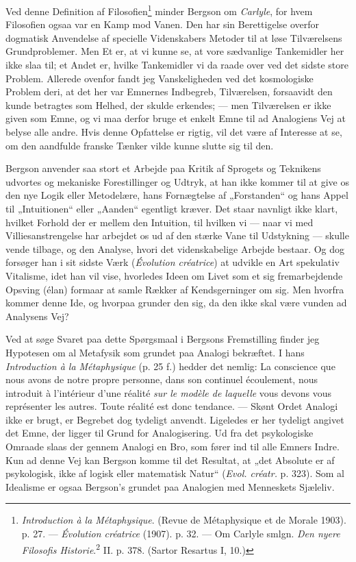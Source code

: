 \documentclass[12pt,a4paper]{book}
\newcommand{\opage}[1]{\marginnote{\footnotesize\textit{[#1]}}}
\begin{document}
Ved denne Definition af Filosofien\footnote{\emph{Introduction à la Métaphysique}.
(Revue de Métaphysique et de Morale 1903). p. 27. --- \emph{Évolution créatrice} (1907).
p. 32. --- Om Carlyle smlgn. \emph{Den nyere Filosofis Historie}.\textsuperscript{2} II.
p. 378. (Sartor Resartus I, 10.)} minder Bergson om \emph{Carlyle}, for hvem Filosofien
ogsaa var en Kamp mod Vanen. Den har sin Berettigelse overfor dogmatisk Anvendelse af
specielle Videnskabers Metoder til at løse Tilværelsens Grundproblemer. Men Et er, at vi
kunne se, at vore sædvanlige Tankemidler her ikke slaa til; et Andet er, hvilke
Tankemidler vi da raade over ved det sidste store Problem. Allerede ovenfor fandt jeg
Vanskeligheden ved det kosmologiske Problem deri, at det her var Emnernes Indbegreb,
Tilværelsen, forsaavidt den kunde betragtes som Helhed, der skulde erkendes; --- men
Tilværelsen er ikke given som Emne, og vi maa derfor bruge et enkelt Emne til ad
Analogiens Vej at belyse alle andre. Hvis denne Opfattelse er rigtig, vil det være af
Interesse at se, om den aandfulde franske Tænker vilde kunne slutte sig til den.

Bergson anvender saa stort et Arbejde paa Kritik af Sprogets og Teknikens udvortes og
mekaniske Forestillinger og Udtryk, at han ikke kommer til at give os den nye Logik eller
Metodelære, hans Fornægtelse af „Forstanden“ og hans Appel til „Intuitionen“ eller
„Aanden“ egentligt kræver. Det staar navnligt ikke klart, hvilket Forhold der er mellem den
Intuition, til hvilken vi --- naar vi med Villiesanstrengelse har arbejdet os ud af den
stærke Vane til Udstykning --- skulle vende tilbage, og den Analyse, hvori det
videnskabelige Arbejde bestaar. Og dog forsøger han i sit sidste Værk (\emph{Évolution
créatrice}) at udvikle en Art spekulativ Vitalisme, idet han vil vise, hvorledes Ideen om
Livet som et sig fremarbejdende Opsving (élan) formaar at samle Rækker af Kendsgerninger
om sig. Men hvorfra kommer denne Ide, og hvorpaa grunder den sig, da den ikke skal være
vunden ad Analysens Vej?

Ved at søge Svaret paa dette Spørgsmaal i Bergsons Fremstilling finder jeg Hypotesen om
al Metafysik som grundet \opage{318} paa Analogi bekræftet. I hans \emph{Introduction à la
Métaphysique} (p. 25 f.) hedder det nemlig: La conscience que nous avons de notre propre
personne, dans son continuel écoulement, nous introduit à l'intérieur d'une réalité
\emph{sur le modèle de laquelle} vous devons vous représenter les autres. Toute réalité
est donc tendance. --- Skønt Ordet Analogi ikke er brugt, er Begrebet dog tydeligt
anvendt. Ligeledes er her tydeligt angivet det Emne, der ligger til Grund for
Analogisering. Ud fra det psykologiske Omraade slaas der gennem Analogi en Bro, som
fører ind til alle Emners Indre. Kun ad denne Vej kan Bergson komme til det Resultat, at
„det Absolute er af psykologisk, ikke af logisk eller matematisk Natur“ (\emph{Evol.
créatr.} p. 323). Som al Idealisme er ogsaa Bergson's grundet paa Analogien med
Menneskets Sjæleliv.
\end{document}
